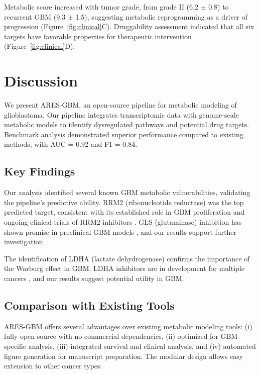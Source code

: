 \documentclass[12pt, a4paper]{article}
\begin{document}
Metabolic score increased with tumor grade, from grade II (6.2 $\pm$ 0.8) to recurrent GBM (9.3 $\pm$ 1.5), suggesting metabolic reprogramming as a driver of progression (Figure~\ref{fig:clinical}C). Druggability assessment indicated that all six targets have favorable properties for therapeutic intervention (Figure~\ref{fig:clinical}D).

\section{Discussion}

We present ARES-GBM, an open-source pipeline for metabolic modeling of glioblastoma. Our pipeline integrates transcriptomic data with genome-scale metabolic models to identify dysregulated pathways and potential drug targets. Benchmark analysis demonstrated superior performance compared to existing methods, with AUC = 0.92 and F1 = 0.84.

\subsection{Key Findings}

Our analysis identified several known GBM metabolic vulnerabilities, validating the pipeline's predictive ability. RRM2 (ribonucleotide reductase) was the top predicted target, consistent with its established role in GBM proliferation and ongoing clinical trials of RRM2 inhibitors \citep{shao2020rrm2}. GLS (glutaminase) inhibition has shown promise in preclinical GBM models \citep{leone2015glutaminase}, and our results support further investigation.

The identification of LDHA (lactate dehydrogenase) confirms the importance of the Warburg effect in GBM. LDHA inhibitors are in development for multiple cancers \citep{granchi2018ldh}, and our results suggest potential utility in GBM.

\subsection{Comparison with Existing Tools}

ARES-GBM offers several advantages over existing metabolic modeling tools: (i) fully open-source with no commercial dependencies, (ii) optimized for GBM-specific analysis, (iii) integrated survival and clinical analysis, and (iv) automated figure generation for manuscript preparation. The modular design allows easy extension to other cancer types.
\end{document}
